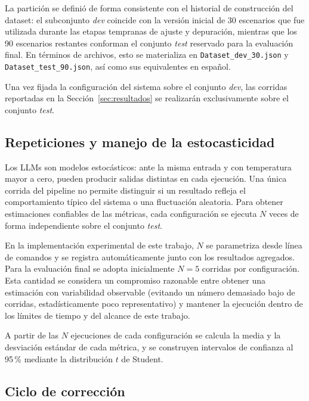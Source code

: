 La partición se definió de forma consistente con el historial de construcción del dataset: el subconjunto \textit{dev} coincide con la versión inicial de 30 escenarios que fue utilizada durante las etapas tempranas de ajuste y depuración, mientras que los 90 escenarios restantes conforman el conjunto \textit{test} reservado para la evaluación final. En términos de archivos, esto se materializa en \texttt{Dataset\_dev\_30.json} y \texttt{Dataset\_test\_90.json}, así como sus equivalentes en español.

Una vez fijada la configuración del sistema sobre el conjunto \textit{dev}, las corridas reportadas en la Sección~\ref{sec:resultados} se realizarán exclusivamente sobre el conjunto \textit{test}.

\subsection{Repeticiones y manejo de la estocasticidad}
\label{sec:repeticiones-estocasticidad}

Los LLMs son modelos estocásticos: ante la misma entrada y con temperatura mayor a cero, pueden producir salidas distintas en cada ejecución. Una única corrida del pipeline no permite distinguir si un resultado refleja el comportamiento típico del sistema o una fluctuación aleatoria. Para obtener estimaciones confiables de las métricas, cada configuración se ejecuta $N$ veces de forma independiente sobre el conjunto \textit{test}.

En la implementación experimental de este trabajo, $N$ se parametriza desde línea de comandos y se registra automáticamente junto con los resultados agregados. Para la evaluación final se adopta inicialmente $N=5$ corridas por configuración. Esta cantidad se considera un compromiso razonable entre obtener una estimación con variabilidad observable (evitando un número demasiado bajo de corridas, estadísticamente poco representativo) y mantener la ejecución dentro de los límites de tiempo y del alcance de este trabajo.

A partir de las $N$ ejecuciones de cada configuración se calcula la media y la desviación estándar de cada métrica, y se construyen intervalos de confianza al 95\,\% mediante la distribución $t$ de Student.

\subsection{Ciclo de corrección}
\label{sec:ciclo-correccion-exp}

